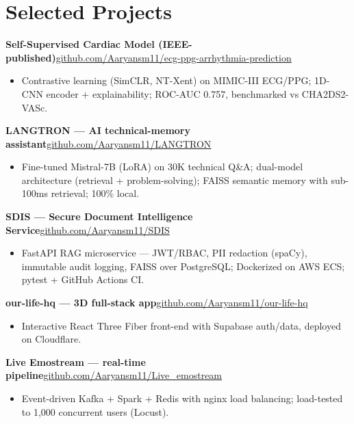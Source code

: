 \documentclass[10pt,a4paper]{article}
\begin{document}
\section*{Selected Projects}
\vspace{1pt}\textbf{Self-Supervised Cardiac Model (IEEE-published)}\hfill {\small\href{https://github.com/Aaryansm11/ecg-ppg-arrhythmia-prediction}{github.com/Aaryansm11/ecg-ppg-arrhythmia-prediction}}
\begin{itemize}
\item Contrastive learning (SimCLR, NT-Xent) on MIMIC-III ECG/PPG; 1D-CNN encoder + explainability; ROC-AUC 0.757, benchmarked vs CHA2DS2-VASc.
\end{itemize}
\vspace{1pt}\textbf{LANGTRON --- AI technical-memory assistant}\hfill {\small\href{https://github.com/Aaryansm11/LANGTRON}{github.com/Aaryansm11/LANGTRON}}
\begin{itemize}
\item Fine-tuned Mistral-7B (LoRA) on 30K technical Q\&A; dual-model architecture (retrieval + problem-solving); FAISS semantic memory with sub-100ms retrieval; 100\% local.
\end{itemize}
\vspace{1pt}\textbf{SDIS --- Secure Document Intelligence Service}\hfill {\small\href{https://github.com/Aaryansm11/SDIS}{github.com/Aaryansm11/SDIS}}
\begin{itemize}
\item FastAPI RAG microservice --- JWT/RBAC, PII redaction (spaCy), immutable audit logging, FAISS over PostgreSQL; Dockerized on AWS ECS; pytest + GitHub Actions CI.
\end{itemize}
\vspace{1pt}\textbf{our-life-hq --- 3D full-stack app}\hfill {\small\href{https://github.com/Aaryansm11/our-life-hq}{github.com/Aaryansm11/our-life-hq}}
\begin{itemize}
\item Interactive React Three Fiber front-end with Supabase auth/data, deployed on Cloudflare.
\end{itemize}
\vspace{1pt}\textbf{Live Emostream --- real-time pipeline}\hfill {\small\href{https://github.com/Aaryansm11/Live_emostream}{github.com/Aaryansm11/Live\_emostream}}
\begin{itemize}
\item Event-driven Kafka + Spark + Redis with nginx load balancing; load-tested to 1,000 concurrent users (Locust).
\end{itemize}
\end{document}
